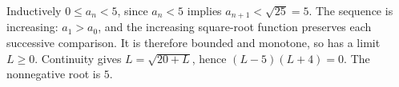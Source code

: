 Inductively $0\le a_n<5$, since $a_n<5$ implies $a_{n+1}<\sqrt{25}=5$. The sequence is increasing: $a_1>a_0$, and the increasing square-root function preserves each successive comparison. It is therefore bounded and monotone, so has a limit $L\ge0$. Continuity gives $L=\sqrt{20+L}$, hence $(L-5)(L+4)=0$. The nonnegative root is $\boxed5$.
